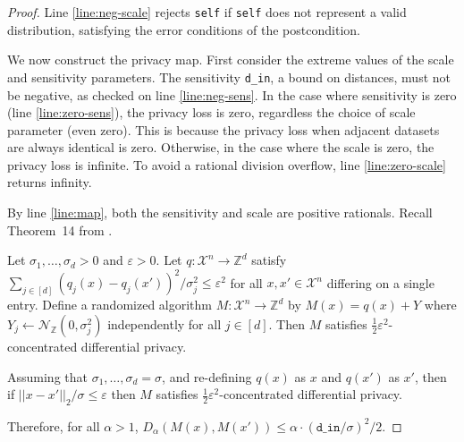 \documentclass{article}
\begin{document}
\begin{proof}
    Line \ref{line:neg-scale} rejects \texttt{self} if \texttt{self} does not represent a valid distribution,
    satisfying the error conditions of the postcondition.

    We now construct the privacy map.
    First consider the extreme values of the scale and sensitivity parameters.
    The sensitivity \texttt{d\_in}, a bound on distances, must not be negative, as checked on line \ref{line:neg-sens}.
    In the case where sensitivity is zero (line \ref{line:zero-sens}), the privacy loss is zero, regardless the choice of scale parameter (even zero).
    This is because the privacy loss when adjacent datasets are always identical is zero.
    Otherwise, in the case where the scale is zero, the privacy loss is infinite.
    To avoid a rational division overflow, line \ref{line:zero-scale} returns infinity.

    By line \ref{line:map}, both the sensitivity and scale are positive rationals.
    Recall Theorem~14 from \cite{CKS20}.

    \begin{theorem}
        Let $\sigma_1, \ldots, \sigma_d > 0$ and $\varepsilon > 0$. 
        Let $q: \mathcal{X}^n \rightarrow \mathbb{Z}^d$ satisfy $\sum_{j \in [d]} (q_j(x) - q_j(x'))^2 / \sigma^2_j \leq \varepsilon^2$ 
        for all $x, x' \in \mathcal{X}^n$ differing on a single entry.
        Define a randomized algorithm $M: \mathcal{X}^n \rightarrow \mathbb{Z}^d$ by $M(x) = q(x) + Y$ where $Y_j \leftarrow \mathcal{N}_\mathbb{Z}(0, \sigma^2_j)$
        independently for all $j \in [d]$.
        Then $M$ satisfies $\frac{1}{2}\varepsilon^2$-concentrated differential privacy.
    \end{theorem}

    Assuming that $\sigma_1, \ldots, \sigma_d = \sigma$, and re-defining $q(x)$ as $x$ and $q(x')$ as $x'$, 
    then if $||x - x'||_2 / \sigma \leq \varepsilon$ then $M$ satisfies $\frac{1}{2}\varepsilon^2$-concentrated differential privacy.

    Therefore, for all $\alpha > 1$, $D_\alpha(M(x), M(x')) \leq \alpha \cdot (\texttt{d\_in} / \sigma)^2 / 2$.
\end{proof}



\end{document}

